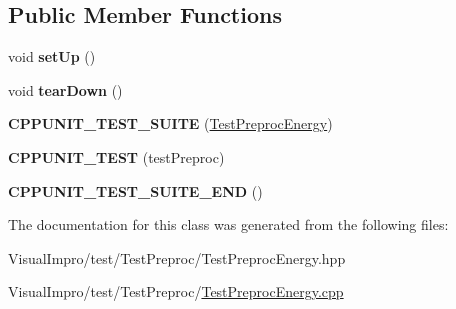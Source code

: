 \subsection*{Public Member Functions}
\begin{DoxyCompactItemize}
\item 
\mbox{\label{class_test_preproc_energy_ab880751403cb6fbb7dad5b9bf4663499}} 
void {\bfseries set\+Up} ()
\item 
\mbox{\label{class_test_preproc_energy_a66f6fe9299feb4b1e7d43138ac1bd9ff}} 
void {\bfseries tear\+Down} ()
\item 
\mbox{\label{class_test_preproc_energy_a540974115d34a903e573dad99f48db87}} 
{\bfseries C\+P\+P\+U\+N\+I\+T\+\_\+\+T\+E\+S\+T\+\_\+\+S\+U\+I\+TE} (\mbox{\hyperlink{class_test_preproc_energy}{Test\+Preproc\+Energy}})
\item 
\mbox{\label{class_test_preproc_energy_af220bc2466d5ffa7f455c066b428f40e}} 
{\bfseries C\+P\+P\+U\+N\+I\+T\+\_\+\+T\+E\+ST} (test\+Preproc)
\item 
\mbox{\label{class_test_preproc_energy_ae3ce026ff44590098d7d4a504cedb4e5}} 
{\bfseries C\+P\+P\+U\+N\+I\+T\+\_\+\+T\+E\+S\+T\+\_\+\+S\+U\+I\+T\+E\+\_\+\+E\+ND} ()
\end{DoxyCompactItemize}


The documentation for this class was generated from the following files\+:\begin{DoxyCompactItemize}
\item 
Visual\+Impro/test/\+Test\+Preproc/Test\+Preproc\+Energy.\+hpp\item 
Visual\+Impro/test/\+Test\+Preproc/\mbox{\hyperlink{_test_preproc_energy_8cpp}{Test\+Preproc\+Energy.\+cpp}}\end{DoxyCompactItemize}
